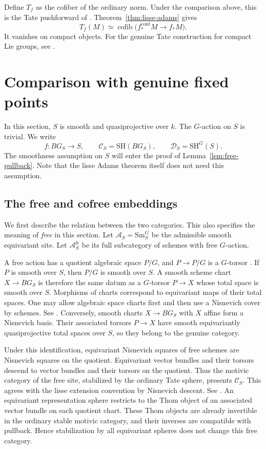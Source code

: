 \documentclass[11pt,reqno]{amsart}
\theoremstyle{definition}
\theoremstyle{remark}
\theoremstyle{plain}
\numberwithin{equation}{section}
\newcommand{\SH}{\mathrm{SH}}
\DeclareMathOperator{\cofib}{cofib}
\newcommand{\cont}{\mathrm{cont}}
\begin{document}
Define \(T_f\) as the cofiber of the ordinary norm.
Under the comparison above, this is the Tate pushforward of
\cite[Construction~1.3.8]{RaksitTate}.
Theorem~\ref{thm:lisse-adams} gives
\[
 T_f(M)\simeq
 \cofib\bigl(f_*^{\cont}M\longrightarrow f_*M\bigr).
\]
It vanishes on compact objects. For the genuine Tate construction for compact Lie groups, see
\cite{GreenleesMayTate}.

\section{Comparison with genuine fixed points}
\label{sec:genuine-comparison}

In this section, \(S\) is smooth and quasiprojective over \(k\).
The \(G\)-action on \(S\) is trivial.
We write
\[
 f:BG_S\longrightarrow S,\qquad
 \mathcal C_S=\SH(BG_S),\qquad
 \mathcal D_S=\SH^G(S).
\]
The smoothness assumption on \(S\) will enter the proof of
Lemma~\ref{lem:free-pullback}.
Note that the lisse Adams theorem itself does not need this assumption.

\subsection{The free and cofree embeddings}

We first describe the relation between the two categories.
This also specifies the meaning of \emph{free} in this section.
Let \(\mathcal A_S=\mathrm{Sm}^G_S\) be the admissible smooth equivariant site.
Let \(\mathcal A_S^{\mathrm{fr}}\) be its full subcategory of schemes with
free \(G\)-action.

A free action has a quotient algebraic space \(P/G\), and
\(P\to P/G\) is a \(G\)-torsor
\cite[Tag 06PH]{Stacks}.
If \(P\) is smooth over \(S\), then \(P/G\) is smooth over \(S\).
A smooth scheme chart \(X\to BG_S\) is therefore the same datum as
a \(G\)-torsor \(P\to X\) whose total space is smooth over \(S\).
Morphisms of charts correspond to equivariant maps of their total spaces.
One may allow algebraic space charts first and then use a Nisnevich cover
by schemes. See \cite[Example 12.23(iii)]{KhanRaviStacks}.
Conversely, smooth charts \(X\to BG_S\) with \(X\) affine form a Nisnevich basis. 
Their associated torsors \(P\to X\) have smooth equivariantly quasiprojective total spaces over \(S\), 
so they belong to the genuine category.

Under this identification, equivariant Nisnevich squares of free schemes
are Nisnevich squares on the quotient.
Equivariant vector bundles and their torsors descend to vector bundles
and their torsors on the quotient.
Thus the motivic category of the free site, stabilized by the ordinary
Tate sphere, presents \(\mathcal C_S\).
This agrees with the lisse extension convention by Nisnevich descent.
See \cite[Section 1, especially Lemma 1.5]{KhanRavi}.
An equivariant representation sphere restricts to the Thom object of
an associated vector bundle on each quotient chart.
These Thom objects are already invertible in the ordinary stable
motivic category, and their inverses are compatible with pullback.
Hence stabilization by all equivariant spheres does not change this
free category.
\end{document}
